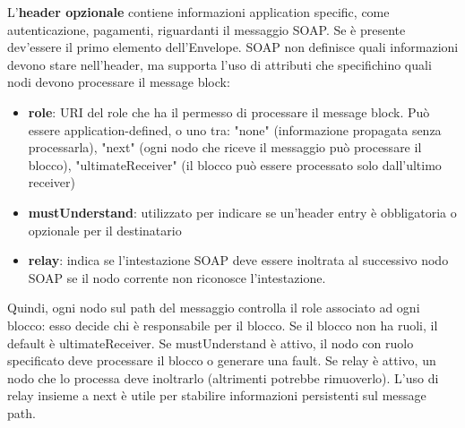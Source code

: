 \documentclass[11pt]{article}
\begin{document}
L'\textbf{header opzionale} contiene informazioni application specific, come autenticazione, pagamenti, riguardanti il messaggio SOAP. Se è presente dev'essere il primo elemento dell'Envelope. SOAP non definisce quali informazioni devono stare nell'header, ma supporta l'uso di attributi che specifichino quali nodi devono processare il message block:
\begin{itemize}
    \item \textbf{role}: URI del role che ha il permesso di processare il message block. Può essere application-defined, o uno tra: "none" (informazione propagata senza processarla), "next" (ogni nodo che riceve il messaggio può processare il blocco), "ultimateReceiver" (il blocco può essere processato solo dall'ultimo receiver)
    \item \textbf{mustUnderstand}: utilizzato per indicare se un'header entry è obbligatoria o opzionale per il destinatario
    \item \textbf{relay}: indica se l'intestazione SOAP deve essere inoltrata al successivo nodo SOAP se il nodo corrente non riconosce l'intestazione.
\end{itemize}
Quindi, ogni nodo sul path del messaggio controlla il role associato ad ogni blocco: esso decide chi è responsabile per il blocco. Se il blocco non ha ruoli, il default è ultimateReceiver. Se mustUnderstand è attivo, il nodo con ruolo specificato deve processare il blocco o generare una fault. Se relay è attivo, un nodo che lo processa deve inoltrarlo (altrimenti potrebbe rimuoverlo). L'uso di relay insieme a next è utile per stabilire informazioni persistenti sul message path. 
\end{document}
